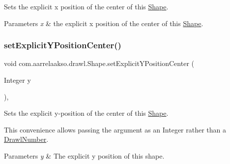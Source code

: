 Sets the explicit x position of the center of this \hyperlink{classcom_1_1aarrelaakso_1_1drawl_1_1_shape}{Shape}. 


\begin{DoxyParams}{Parameters}
{\em x} & the explicit x position of the center of this \hyperlink{classcom_1_1aarrelaakso_1_1drawl_1_1_shape}{Shape}. \\
\hline
\end{DoxyParams}
\mbox{\label{classcom_1_1aarrelaakso_1_1drawl_1_1_shape_a947c00be2ea3d0e732814b8ca377df45}} 
\subsubsection{\texorpdfstring{set\+Explicit\+Y\+Position\+Center()}{setExplicitYPositionCenter()}\hspace{0.1cm}{\footnotesize\ttfamily [1/2]}}
{\footnotesize\ttfamily void com.\+aarrelaakso.\+drawl.\+Shape.\+set\+Explicit\+Y\+Position\+Center (\begin{DoxyParamCaption}\item[{Integer}]{y }\end{DoxyParamCaption})\hspace{0.3cm}{\ttfamily [protected]}, {\ttfamily [inherited]}}



Sets the explicit y-\/position of the center of this \hyperlink{classcom_1_1aarrelaakso_1_1drawl_1_1_shape}{Shape}. 

This convenience allows passing the argument as an Integer rather than a \hyperlink{classcom_1_1aarrelaakso_1_1drawl_1_1_drawl_number}{Drawl\+Number}.


\begin{DoxyParams}{Parameters}
{\em y} & The explicit y position of this shape. \\
\hline
\end{DoxyParams}
\mbox{\label{classcom_1_1aarrelaakso_1_1drawl_1_1_shape_a169bdd3220baa80ebb083b3b2db12546}} 
